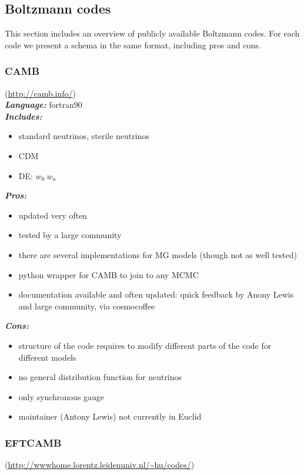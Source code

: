 \newpage
\subsection{Boltzmann codes}
This section includes an overview of publicly available Boltzmann codes. For each code we present a schema in the same format, including pros and cons.



\newpage
\subsubsection{CAMB}
(\url{http://camb.info/})\\

{\it \bf Language:} fortran90\\

{\it \bf Includes:}
\begin{itemize}
 \item standard neutrinos, sterile neutrinos
 \item CDM
 \item DE: $w_0\ w_a$
\end{itemize}

{\it \bf Pros: }
\begin{itemize}
 \item updated very often
 \item tested by a large community
 \item there are several implementations for MG models (though not as well tested)
 \item python wrapper for CAMB to join to any MCMC
 \item documentation available and often updated: quick feedback by Anony Lewis and large community, via cosmocoffee
\end{itemize}

{\it \bf Cons:}
\begin{itemize}
 \item structure of the code requires to modify different parts of the code for different models
 \item no general distribution function for neutrinos
 \item only synchronous gauge
 \item maintainer (Antony Lewis) not currently in Euclid
\end{itemize}

\newpage
\subsubsection{EFTCAMB}
(\url{http://wwwhome.lorentz.leidenuniv.nl/~hu/codes/})\\

